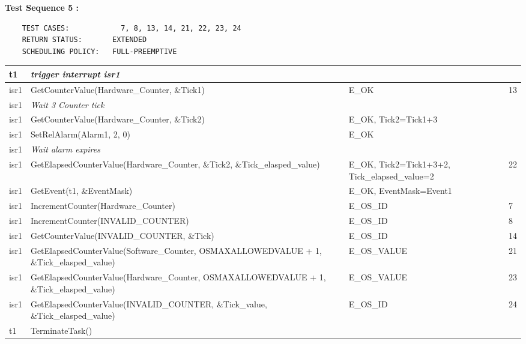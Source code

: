 \documentclass[10pt]{article}
\newlength{\Li}\settowidth{\Li}{Running}
\newlength{\Lii}\setlength{\Lii}{7cm}
\newlength{\Liiii}\setlength{\Liiii}{0.9cm}
\newlength{\Liii}\setlength{\Liii}{\textwidth} \addtolength{\Liii}{-\Li} \addtolength{\Liii}{-\Lii} \addtolength{\Liii}{-\Liiii}
\begin{document}
	\textbf{Test Sequence 5 :}
	\begin{lstlisting}
	TEST CASES:		       7, 8, 13, 14, 21, 22, 23, 24
	RETURN STATUS:	  	 EXTENDED
	SCHEDULING POLICY:   FULL-PREEMPTIVE
	\end{lstlisting}
	
	
	\begin{supertabular}{|p{\Li}|p{\Lii}|p{\Liii}|p{\Liiii}|} \hline 
	t1	& \textit{trigger interrupt isr1}																& 												& \\ \hline
	isr1	& GetCounterValue(Hardware\_Counter, \&Tick1)												& E\_OK											& 13 \\ \hline
	isr1	& \textit{Wait 3 Counter tick }																& 												& \\ \hline
	isr1	& GetCounterValue(Hardware\_Counter, \&Tick2)												& E\_OK, Tick2=Tick1+3								& \\ \hline
	isr1	& SetRelAlarm(Alarm1, 2, 0)																& E\_OK											& \\ \hline
	isr1	& \textit{Wait alarm expires}																&												& \\ \hline
	isr1	& GetElapsedCounterValue(Hardware\_Counter, \&Tick2, \&Tick\_elasped\_value)						& E\_OK, Tick2=Tick1+3+2, Tick\_elapsed\_value=2		& 22 \\ \hline
	isr1	& GetEvent(t1, \&EventMask)																& E\_OK, EventMask=Event1							& \\ \hline
	isr1	& IncrementCounter(Hardware\_Counter)													& E\_OS\_ID										& 7 \\ \hline
	isr1	& IncrementCounter(INVALID\_COUNTER)													& E\_OS\_ID										& 8 \\ \hline
	isr1	& GetCounterValue(INVALID\_COUNTER, \&Tick)												& E\_OS\_ID										& 14 \\ \hline
	isr1	& GetElapsedCounterValue(Software\_Counter, OSMAXALLOWEDVALUE + 1, \&Tick\_elasped\_value)	& E\_OS\_VALUE									& 21 \\ \hline
	isr1	& GetElapsedCounterValue(Hardware\_Counter, OSMAXALLOWEDVALUE + 1, \&Tick\_elasped\_value)	& E\_OS\_VALUE									& 23 \\ \hline
	isr1	& GetElapsedCounterValue(INVALID\_COUNTER, \&Tick\_value, \&Tick\_elasped\_value)				& E\_OS\_ID										& 24 \\ \hline	 
	t1	& TerminateTask()																		& 												& \\ \hline
	\end{supertabular}\\
	
\end{document}
